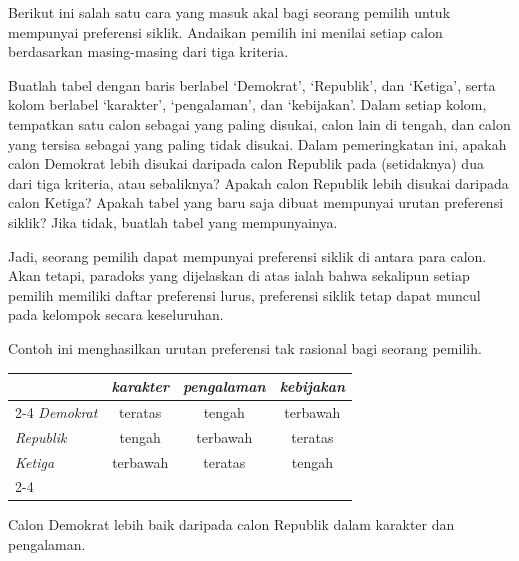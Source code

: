\begin{exercises}
  \item \label{IrrIndVote}
    Berikut ini salah satu cara yang masuk akal bagi seorang pemilih untuk mempunyai preferensi siklik.
    Andaikan pemilih ini menilai setiap calon
    berdasarkan masing-masing dari tiga kriteria.
    \begin{exparts}
      \partsitem Buatlah tabel dengan baris berlabel `Demokrat',
         `Republik', dan `Ketiga', serta kolom berlabel
         `karakter', `pengalaman', dan `kebijakan'.
         Dalam setiap kolom, tempatkan satu
         calon sebagai yang paling disukai,
         calon lain di tengah, dan calon yang tersisa
         sebagai yang paling tidak disukai.
      \partsitem Dalam pemeringkatan ini, apakah calon Demokrat lebih disukai daripada calon Republik
         pada (setidaknya) dua dari tiga kriteria, atau sebaliknya?
         Apakah calon Republik lebih disukai daripada calon Ketiga?
      \partsitem Apakah tabel yang baru saja
         dibuat mempunyai urutan preferensi siklik?
         Jika tidak, buatlah tabel yang mempunyainya.
    \end{exparts}
    Jadi, seorang pemilih dapat mempunyai preferensi siklik di antara para calon.
    Akan tetapi, paradoks yang dijelaskan di atas ialah bahwa sekalipun setiap pemilih memiliki
    daftar preferensi lurus,
    preferensi siklik tetap dapat muncul pada kelompok secara keseluruhan.
    \begin{answer}
      Contoh ini menghasilkan urutan preferensi tak rasional bagi
      seorang pemilih.
      \smallskip
      \begin{center}
        \begin{tabular}{l|c|c|c|}
             \multicolumn{1}{c}{\ }
                  &\multicolumn{1}{c}{\textit{karakter}}
                  &\multicolumn{1}{c}{\textit{pengalaman}}
                  &\multicolumn{1}{c}{\textit{kebijakan}}   \\ 
          \cline{2-4}
         \textit{Demokrat}   &teratas &tengah  &terbawah \\
         \textit{Republik}   &tengah  &terbawah &teratas \\
         \textit{Ketiga}     &terbawah &teratas &tengah  \\
          \cline{2-4}
        \end{tabular}
      \end{center}
      \smallskip
      Calon Demokrat lebih baik daripada calon Republik dalam karakter dan
      pengalaman.

\end{answer}
\end{exercises}
